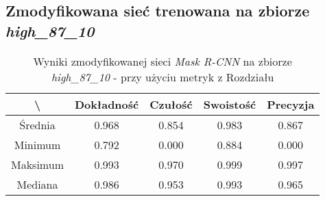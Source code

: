 \subsection{Zmodyfikowana sieć trenowana na zbiorze \textit{high\_87\_10}}

\begin{table}[H]
	\centering
	\caption{Wyniki zmodyfikowanej sieci \textit{Mask R-CNN} na zbiorze \textit{high\_87\_10} - przy użyciu metryk z Rozdziału }
	\vspace{6pt}
	{\footnotesize
		\begin{tabular}{|c|c|c|c|c|}
      \hline \textbackslash & Dokładność & Czułość & Swoistość & Precyzja \\
      \hline Średnia & 0.968 & 0.854 & 0.983 & 0.867 \\
      \hline Minimum & 0.792 & 0.000 & 0.884 & 0.000 \\
      \hline Maksimum & 0.993 & 0.970 & 0.999 & 0.997 \\
      \hline Mediana & 0.986 & 0.953 & 0.993 & 0.965 \\
      \hline
		\end{tabular}
	}
  \vspace{0pt}
  \label{Tab:high_modified_calculated}
\end{table}

